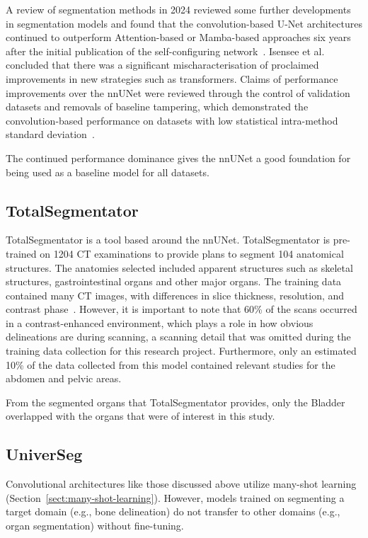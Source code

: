 \documentclass[11pt,twoside]{report}
\begin{document}
A review of segmentation methods in 2024 reviewed some further developments in segmentation models and found that the convolution-based U-Net architectures continued to outperform Attention-based or Mamba-based approaches six years after the initial publication of the self-configuring network~\cite{isensee2024nnunet}. Isensee et al. concluded that there was a significant mischaracterisation of proclaimed improvements in new strategies such as transformers. Claims of performance improvements over the nnUNet were reviewed through the control of validation datasets and removals of baseline tampering, which demonstrated the convolution-based performance on datasets with low statistical intra-method standard deviation~\cite{isensee2024nnunet}.

The continued performance dominance gives the nnUNet a good foundation for being used as a baseline model for all datasets.

\subsection{TotalSegmentator}

TotalSegmentator is a tool based around the nnUNet. TotalSegmentator is pre-trained on 1204 CT examinations to provide plans to segment 104 anatomical structures. The anatomies selected included apparent structures such as skeletal structures, gastrointestinal organs and other major organs. The training data contained many CT images, with differences in slice thickness, resolution, and contrast phase~\cite{totalsegmentor-paper}. However, it is important to note that 60\% of the scans occurred in a contrast-enhanced environment, which plays a role in how obvious delineations are during scanning, a scanning detail that was omitted during the training data collection for this research project. Furthermore, only an estimated 10\% of the data collected from this model contained relevant studies for the abdomen and pelvic areas.

From the segmented organs that TotalSegmentator provides, only the Bladder overlapped with the organs that were of interest in this study.

\subsection{UniverSeg}\label{sect:universeg}

Convolutional architectures like those discussed above utilize many-shot learning (Section~\ref{sect:many-shot-learning}). However, models trained on segmenting a target domain (e.g., bone delineation) do not transfer to other domains (e.g., organ segmentation) without fine-tuning.
\end{document}
